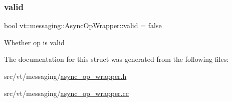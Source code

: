 \subsubsection{\texorpdfstring{valid}{valid}}
{\footnotesize\ttfamily bool vt\+::messaging\+::\+Async\+Op\+Wrapper\+::valid = false}

Whether op is valid 

The documentation for this struct was generated from the following files\+:\begin{DoxyCompactItemize}
\item 
src/vt/messaging/\hyperlink{async__op__wrapper_8h}{async\+\_\+op\+\_\+wrapper.\+h}\item 
src/vt/messaging/\hyperlink{async__op__wrapper_8cc}{async\+\_\+op\+\_\+wrapper.\+cc}\end{DoxyCompactItemize}
